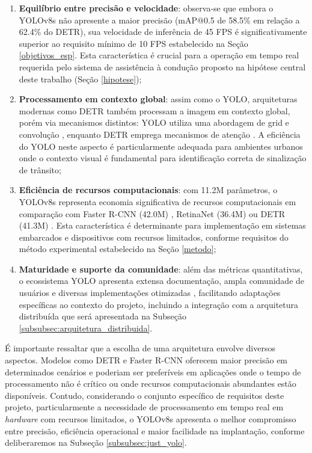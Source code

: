 \begin{enumerate}
    \item \textbf{Equilíbrio entre precisão e velocidade}: observa-se que embora o YOLOv8s não apresente a maior precisão (mAP@0.5 de 58.5\% em relação a 62.4\% do DETR), sua velocidade de inferência de 45 FPS é significativamente superior ao requisito mínimo de 10 FPS estabelecido na Seção \ref{objetivos_esp}. Esta característica é crucial para a operação em tempo real requerida pelo sistema de assistência à condução proposto na hipótese central deste trabalho (Seção \ref{hipotese});
    
    \item \textbf{Processamento em contexto global}: assim como o YOLO, arquiteturas modernas como DETR também processam a imagem em contexto global, porém via mecanismos distintos: YOLO utiliza uma abordagem de grid e convolução \cite{wang2024yolov10realtimeendtoendobject}, enquanto DETR emprega mecanismos de atenção \cite{carion2020end}. A eficiência do YOLO neste aspecto é particularmente adequada para ambientes urbanos onde o contexto visual é fundamental para identificação correta de sinalização de trânsito;
    
    \item \textbf{Eficiência de recursos computacionais}: com 11.2M parâmetros, o YOLOv8s representa economia significativa de recursos computacionais em comparação com Faster R-CNN (42.0M) \cite{liu2020deep}, RetinaNet (36.4M) \cite{lin2017focal} ou DETR (41.3M) \cite{carion2020end}. Esta característica é determinante para implementação em sistemas embarcados e dispositivos com recursos limitados, conforme requisitos do método experimental estabelecido na Seção \ref{metodo};
    
    \item \textbf{Maturidade e suporte da comunidade}: além das métricas quantitativas, o ecossistema YOLO apresenta extensa documentação, ampla comunidade de usuários e diversas implementações otimizadas \cite{wang2024yolov10realtimeendtoendobject}, facilitando adaptações específicas ao contexto do projeto, incluindo a integração com a arquitetura distribuída que será apresentada na Subseção \ref{subsubsec:arquitetura_distribuida}.
\end{enumerate}

É importante ressaltar que a escolha de uma arquitetura envolve diversos aspectos. Modelos como DETR e Faster R-CNN oferecem maior precisão em determinados cenários e poderiam ser preferíveis em aplicações onde o tempo de processamento não é crítico ou onde recursos computacionais abundantes estão disponíveis. Contudo, considerando o conjunto específico de requisitos deste projeto, particularmente a necessidade de processamento em tempo real em \textit{hardware} com recursos limitados, o YOLOv8s apresenta o melhor compromisso entre precisão, eficiência operacional e maior facilidade na implantação, conforme deliberaremos na Subseção \ref{subsubsec:just_yolo}.

